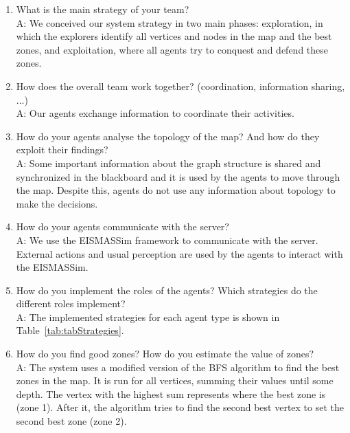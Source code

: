 \begin{enumerate}
	\item  What is the main strategy of your team?\\
	A: We conceived our system strategy in two main phases: exploration, in which the explorers identify all vertices and nodes in the map and the best zones, and exploitation, where all agents try to conquest and defend these zones.%
	 
 	\item  How does the overall team work together? (coordination, information sharing, ...)\\
	A: Our agents exchange information to coordinate their activities.%

	\item  How do your agents analyse the topology of the map? And how do they exploit their findings?\\
	A: Some important information about the graph structure is shared and synchronized in the blackboard and it is used by the agents to move through the map. Despite this, agents do not use any information about topology to make the decisions. %

	\item  How do your agents communicate with the server? \\
	A: We use the EISMASSim framework to communicate with the server. External actions and usual perception are used by the agents to interact with the EISMASSim.%

	
	\item  How do you implement the roles of the agents? Which strategies do the different roles implement?\\
	A: The implemented strategies for each agent type is shown in Table~\ref{tab:tabStrategies}.%
	
	\item  How do you find good zones? How do you estimate the value of zones?\\
	A: The system uses a modified version of the BFS algorithm to find the best zones in the map. It is run for all vertices, summing their values until some depth. The vertex with the highest sum represents where the best zone is (zone 1). After it, the algorithm tries to find the second best vertex to set the second best zone (zone 2).%



\end{enumerate}
